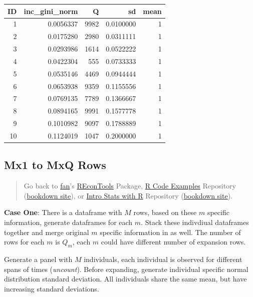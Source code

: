 \documentclass[
]{book}
\begin{document}
\begin{table}[!h]
\centering
\begin{tabular}{r|r|r|r|r}
\hline
ID & inc\_gini\_norm & Q & sd & mean\\
\hline
\rowcolor{gray!6}  1 & 0.0056337 & 9982 & 0.0100000 & 1\\
\hline
2 & 0.0175280 & 2980 & 0.0311111 & 1\\
\hline
\rowcolor{gray!6}  3 & 0.0293986 & 1614 & 0.0522222 & 1\\
\hline
4 & 0.0422304 & 555 & 0.0733333 & 1\\
\hline
\rowcolor{gray!6}  5 & 0.0535146 & 4469 & 0.0944444 & 1\\
\hline
6 & 0.0653938 & 9359 & 0.1155556 & 1\\
\hline
\rowcolor{gray!6}  7 & 0.0769135 & 7789 & 0.1366667 & 1\\
\hline
8 & 0.0894165 & 9991 & 0.1577778 & 1\\
\hline
\rowcolor{gray!6}  9 & 0.1010982 & 9097 & 0.1788889 & 1\\
\hline
10 & 0.1124019 & 1047 & 0.2000000 & 1\\
\hline
\end{tabular}
\end{table}

\hypertarget{mx1-to-mxq-rows}{%
\subsection{Mx1 to MxQ Rows}\label{mx1-to-mxq-rows}}

\begin{quote}
Go back to \href{http://fanwangecon.github.io/}{fan}'s \href{https://fanwangecon.github.io/REconTools/}{REconTools} Package, \href{https://fanwangecon.github.io/R4Econ/}{R Code Examples} Repository (\href{https://fanwangecon.github.io/R4Econ/bookdown}{bookdown site}), or \href{https://fanwangecon.github.io/Stat4Econ/}{Intro Stats with R} Repository (\href{https://fanwangecon.github.io/Stat4Econ/bookdown}{bookdown site}).
\end{quote}

\textbf{Case One}: There is a dataframe with \(M\) rows, based on these \(m\) specific information, generate dataframes for each \(m\). Stack these indivdiual dataframes together and merge original \(m\) specific information in as well. The number of rows for each \(m\) is \(Q_m\), each \(m\) could have different number of expansion rows.

Generate a panel with \(M\) individuals, each individual is observed for different spans of times (\emph{uncount}). Before expanding, generate individual specific normal distribution standard deviation. All individuals share the same mean, but have increasing standard deviations.
\end{document}

